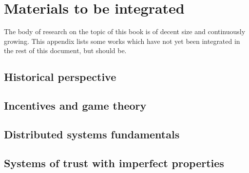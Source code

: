 \chapter{Materials to be integrated}
The body of research on the topic of this book is of decent size and continuously growing. This appendix lists some works which have not yet been integrated in the rest of this document, but should be.

\section{Historical perspective}

\section{Incentives and game theory}

\section{Distributed systems fundamentals}

\section{Systems of trust with imperfect properties}
